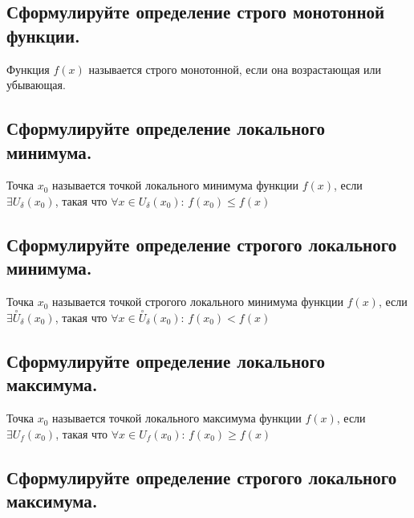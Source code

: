 \subsection{Сформулируйте определение строго монотонной функции.}

Функция $f(x)$ называется строго монотонной, если она возрастающая или убывающая.



\subsection{Сформулируйте определение локального минимума.}

Точка $x_0$ называется точкой локального минимума функции $f(x)$, если $\exists U_{\delta}(x_0)$, такая что $\forall x \in U_{\delta}(x_0)$: $f(x_0) \leqslant f(x)$



\subsection{Сформулируйте определение строгого локального минимума.}

Точка $x_0$ называется точкой строгого локального минимума функции $f(x)$, если $\exists \overset{\circ}{U}_{\delta}(x_0)$, такая что $\forall x \in \overset{\circ}{U}_{\delta}(x_0)$: $f(x_0) < f(x)$



\subsection{Сформулируйте определение локального максимума.}

Точка $x_0$ называется точкой локального максимума функции $f(x)$, если $\exists U_f(x_0)$, такая что $\forall x \in U_f(x_0)$: $f(x_0) \geqslant f(x)$



\subsection{Сформулируйте определение строгого локального максимума.}

